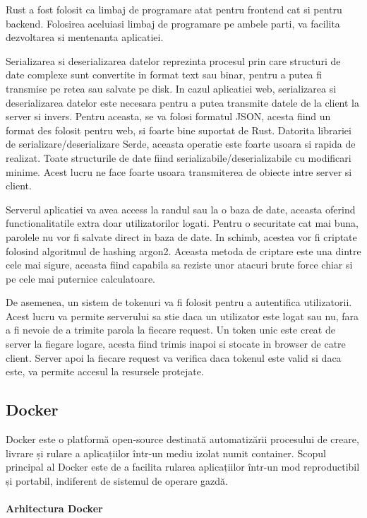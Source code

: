 \documentclass[titlepage,12pt]{article}
\begin{document}
\ac {Rust} a fost folosit ca limbaj de programare atat pentru frontend cat si pentru backend.
Folosirea aceluiasi limbaj de programare pe ambele parti, va facilita dezvoltarea si mentenanta aplicatiei.

Serializarea si deserializarea datelor reprezinta procesul prin care structuri de date complexe sunt convertite in format text sau binar, pentru a putea fi transmise pe retea sau salvate pe disk.
In cazul aplicatiei web, serializarea si deserializarea datelor este necesara pentru a putea transmite datele de la client la server si invers.
Pentru aceasta, se va folosi formatul JSON, acesta fiind un format des folosit pentru web, si foarte bine suportat de \ac {Rust}.
Datorita librariei de serializare/deserializare Serde, aceasta operatie este foarte usoara si rapida de realizat.
Toate structurile de date fiind serializabile/deserializabile cu modificari minime.
Acest lucru ne face foarte usoara transmiterea de obiecte intre server si client.

Serverul aplicatiei va avea access la randul sau la o baza de date, aceasta oferind functionalitatile extra doar utilizatorilor logati.
Pentru o securitate cat mai buna, parolele nu vor fi salvate direct in baza de date.
In schimb, acestea vor fi criptate folosind algoritmul de hashing argon2.
Aceasta metoda de criptare este una dintre cele mai sigure, aceasta fiind capabila sa reziste unor atacuri brute force chiar si pe cele mai puternice calculatoare.

De asemenea, un sistem de tokenuri va fi folosit pentru a autentifica utilizatorii.
Acest lucru va permite serverului sa stie daca un utilizator este logat sau nu, fara a fi nevoie de a trimite parola la fiecare request.
Un token unic este creat de server la fiegare logare, acesta fiind trimis inapoi si stocate in browser de catre client.
Server apoi la fiecare request va verifica daca tokenul este valid si daca este, va permite accesul la resursele protejate.

\subsection {Docker}

Docker\cite{ref:docker} este o platformă open-source destinată automatizării procesului de creare, livrare și rulare a aplicațiilor într-un mediu izolat numit container.
Scopul principal al Docker este de a facilita rularea aplicațiilor într-un mod reproductibil și portabil, indiferent de sistemul de operare gazdă.
\paragraph{Arhitectura Docker}
\end{document}
